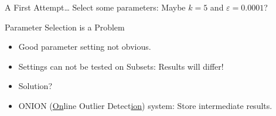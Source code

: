 \documentclass{beamer}
\begin{document}
\begin{frame}{A First Attempt\ldots}
    Select some parameters: \alert{Maybe $k = 5$ and $\varepsilon = 0.0001$}?
    \begin{center}
    \end{center}
\end{frame}
\begin{frame}{Parameter Selection is a Problem}
    \begin{itemize}
        \item Good parameter setting not obvious. 
        \item Settings can not be tested on Subsets: \alert{Results will differ!}
        \item Solution?\pause

        \item ONION (\underline{On}line Outlier Detect\underline{ion}) system: Store intermediate results.
    \end{itemize}
\end{frame}
\end{document}
